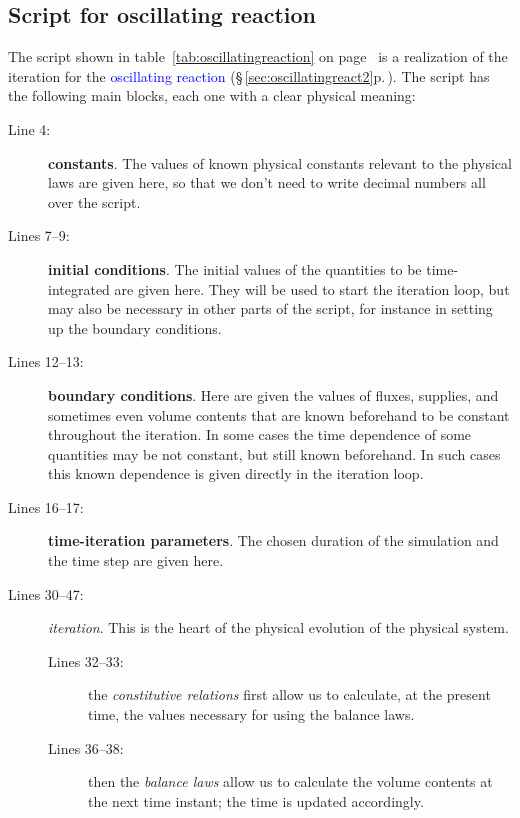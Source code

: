 \documentclass[a4paper,12pt,%
onecolumn,oneside,%
british%
]{memoir}
\renewcommand*{\|}[1][]{\nonscript\:#1\vert\nonscript\:\mathopen{}}
\newcommand*{\sect}{\S}%
\renewcommand*{\autoref}[3][\sect\,\ref]{\textcolor{blue}{#3} {\color{blue}\scriptsize(\faIcon[regular]{eye}\;#1{#2}\;p.\,\pageref{#2})}}
\begin{document}
\subsection{Script for oscillating reaction}

The script shown in table~\ref{tab:oscillatingreaction} on page~\pageref{tab:oscillatingreaction} is a realization of the iteration for the \autoref{sec:oscillatingreact2}{oscillating reaction}. The script has the following main blocks, each one with a clear physical meaning:
\begin{description}
\item[Line 4:] \textbf{constants}. The values of known physical constants relevant to the physical laws are given here, so that we don't need to write decimal numbers all over the script.

\item[Lines 7--9:] \textbf{initial conditions}. The initial values of the quantities to be time-integrated are given here. They will be used to start the iteration loop, but may also be necessary in other parts of the script, for instance in setting up the boundary conditions.

\item[Lines 12--13:] \textbf{boundary conditions}. Here are given the values of fluxes, supplies, and sometimes even volume contents that are known beforehand to be constant throughout the iteration. In some cases the time dependence of some quantities may be not constant, but still known beforehand. In such cases this known dependence is given directly in the iteration loop.

\item[Lines 16--17:] \textbf{time-iteration parameters}. The chosen duration of the simulation and the time step are given here.

\item[Lines 30--47:] \emph{iteration}. This is the heart of the physical evolution of the physical system.
  \begin{description}
  \item[Lines 32--33:] the \emph{constitutive relations} first allow us to calculate, at the present time, the values necessary for using the balance laws.
  \item[Lines 36--38:] then the \emph{balance laws} allow us to calculate the volume contents at the next time instant; the time is updated accordingly.
  \end{description}
\end{description}
\end{document}
